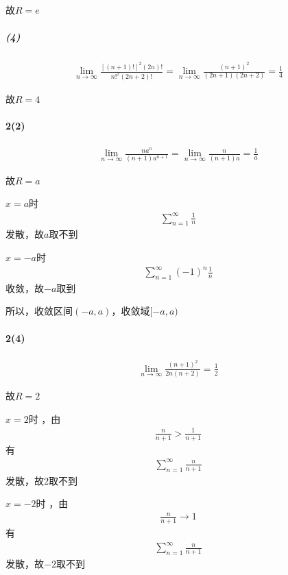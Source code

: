 \documentclass[UTF8]{ctexart}
\begin{document}
    故$R=e$

    \subparagraph*{(4)}
    \begin{align*}
        \lim \limits_{n \to \infty} \frac{[(n+1)!]^2 (2n)!}{n!^2 (2n+2)!} 
        = \lim \limits_{n \to \infty} \frac{(n+1)^2}{(2n+1)(2n+2)}
        = \frac{1}{4} 
    \end{align*}

    故$R=4$

    \paragraph*{2(2)}
    \begin{align*}
        \lim \limits_{n \to \infty} \frac{na^n}{(n+1)a^{n+1}} 
        = \lim \limits_{n \to \infty} \frac{n}{(n+1)a} 
        = \frac{1}{a} 
    \end{align*}

    故$R=a$

    $x = a$时 
    \begin{align*}
        \sum_{n=1}^{\infty} \frac{1}{n}
    \end{align*}
    发散，故$a$取不到

    $x = -a$时 
    \begin{align*}
        \sum_{n=1}^{\infty} (-1)^n\frac{1}{n}
    \end{align*}
    收敛，故$-a$取到

    所以，收敛区间$(-a,a)$，收敛域$[-a, a)$

    \paragraph*{2(4)}
    \begin{align*}
        \lim \limits_{n \to \infty} \frac{(n+1)^2}{2n(n+2)} 
        = \frac{1}{2} 
    \end{align*}

    故$R=2$

    $x = 2$时 ，由
    \begin{align*}
        \frac{n}{n+1} > \frac{1}{n+1} 
    \end{align*}
    有
    \begin{align*}
        \sum_{n=1}^{\infty} \frac{n}{n+1}
    \end{align*}
    发散，故$2$取不到

    $x = -2$时 ，由
    \begin{align*}
        \frac{n}{n+1} \to 1
    \end{align*}
    有
    \begin{align*}
        \sum_{n=1}^{\infty} \frac{n}{n+1}
    \end{align*}
    发散，故$-2$取不到
\end{document}
